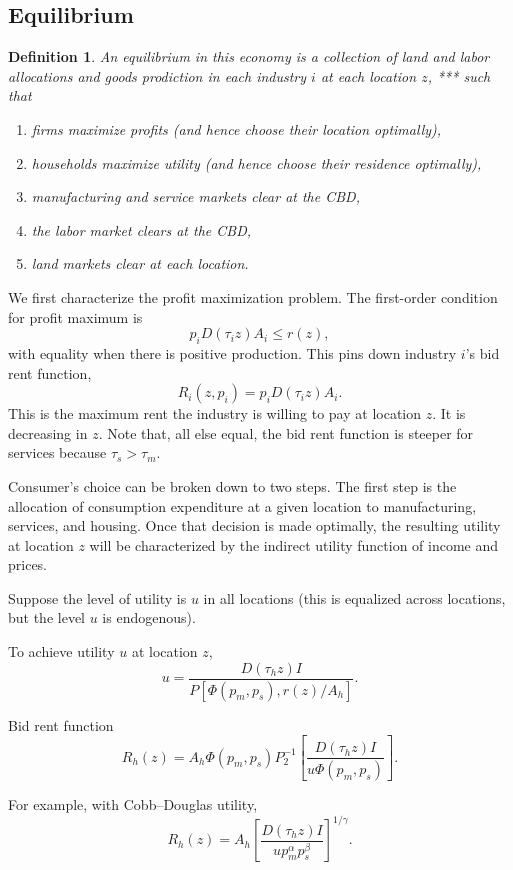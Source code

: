 \documentclass[12pt]{article}
\newtheorem{definition}{Definition}
\begin{document}
\subsection{Equilibrium}
\begin{definition}
 An \emph{equilibrium} in this economy is a collection of land and labor allocations and goods prodiction in each industry $i$ at each location $z$, *** such that
\begin{enumerate}
 \item firms maximize profits (and hence choose their location optimally),
 \item households maximize utility (and hence choose their residence optimally),
 \item manufacturing and service markets clear at the CBD,
 \item the labor market clears at the CBD,
 \item land markets clear at each location.
\end{enumerate}

\end{definition}

We first characterize the profit maximization problem. The first-order condition for profit maximum is
\[
p_i D(\tau_i z)A_i \le r(z),
\]
with equality when there is positive production. This pins down industry $i$'s bid rent function,
\[
R_i(z,p_i) = p_i D(\tau_i z)A_i.
\]
This is the maximum rent the industry is willing to pay at location $z$. It is decreasing in $z$. Note that, all else equal, the bid rent function is steeper for services because $\tau_s>\tau_m$.

Consumer's choice can be broken down to two steps. The first step is the allocation of consumption expenditure at a given location to manufacturing, services, and housing. Once that decision is made optimally, the resulting utility at location $z$ will be characterized by the indirect utility function of income and prices.

Suppose the level of utility is $u$ in all locations (this is equalized across locations, but the level $u$ is endogenous). 

To achieve utility $u$ at location $z$,
    \[
    u = \frac{D(\tau_h z) I}{P[\Phi(p_m,p_s),r(z)/A_h]}.
    \]
    \item Bid rent function
    \[
    R_h(z) = A_h\Phi(p_m,p_s)P_2^{-1}\left[\frac{D(\tau_h z) I}{u\Phi(p_m,p_s)}\right].
    \]
	\item For example, with Cobb--Douglas utility,
\[
R_h(z) = A_h\left[\frac{D(\tau_h z) I}{up_m^{\alpha}p_s^{\beta}}\right]^{1/\gamma}.
\]
\end{document}
